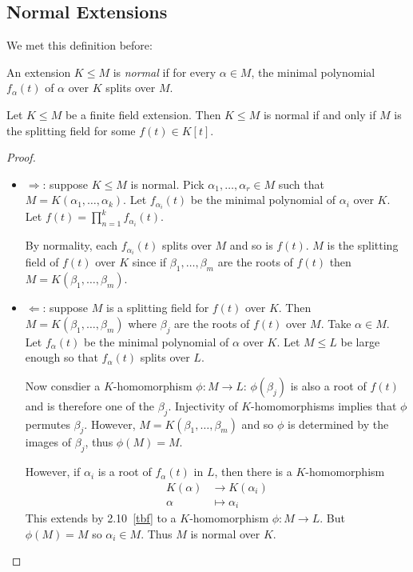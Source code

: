 \documentclass[a4paper]{article}
\begin{document}
\subsection{Normal Extensions}

We met this definition before:

\begin{definition}
  An extension \(K \leq M\) is \emph{normal} if for every \(\alpha \in M\), the minimal polynomial \(f_\alpha(t)\) of \(\alpha\) over \(K\) splits over \(M\).
\end{definition}

\begin{theorem}
  Let \(K \leq M\) be a finite field extension. Then \(K \leq M\) is normal if and only if \(M\) is the splitting field for some \(f(t) \in K[t]\).
\end{theorem}

\begin{proof}\leavevmode
  \begin{itemize}
  \item \(\Rightarrow\): suppose \(K \leq M\) is normal. Pick \(\alpha_1, \dots, \alpha_r \in M\) such that \(M = K(\alpha_1, \dots, \alpha_k)\). Let \(f_{\alpha_i}(t)\) be the minimal polynomial of \(\alpha_i\) over \(K\). Let \(f(t) = \prod_{n = 1}^{k} f_{\alpha_i}(t)\).

    By normality, each \(f_{\alpha_i}(t)\) splits over \(M\) and so is \(f(t)\). \(M\) is the splitting field of \(f(t)\) over \(K\) since if \(\beta_1, \dots, \beta_m\) are the roots of \(f(t)\) then \(M = K(\beta_1, \dots, \beta_m)\).
  \item \(\Leftarrow\): suppose \(M\) is a splitting field for \(f(t)\) over \(K\). Then \(M = K(\beta_1, \dots, \beta_m)\) where \(\beta_j\) are the roots of \(f(t)\) over \(M\). Take \(\alpha \in M\). Let \(f_\alpha(t)\) be the minimal polynomial of \(\alpha\) over \(K\). Let \(M \leq L\) be large enough so that \(f_\alpha(t)\) splits over \(L\).

    Now consdier a \(K\)-homomorphism \(\phi: M \to L\): \(\phi(\beta_j)\) is also a root of \(f(t)\) and is therefore one of the \(\beta_j\). Injectivity of \(K\)-homomorphisms implies that \(\phi\) permutes \(\beta_j\). However, \(M = K(\beta_1, \dots, \beta_m)\) and so \(\phi\) is determined by the images of \(\beta_j\), thus \(\phi(M) = M\).

    However, if \(\alpha_i\) is a root of \(f_\alpha(t)\) in \(L\), then there is a \(K\)-homomorphism
    \begin{align*}
      K(\alpha) &\to K(\alpha_i) \\
      \alpha &\mapsto \alpha_i
    \end{align*}
    This extends by 2.10~\ref{tbf} to a \(K\)-homomorphism \(\phi: M \to L\). But \(\phi(M) = M\) so \(\alpha_i \in M\). Thus \(M\) is normal over \(K\).
  \end{itemize}
\end{proof}
\end{document}
